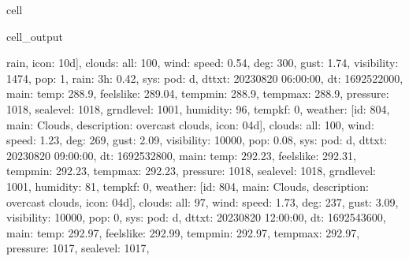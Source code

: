 \documentclass[letterpaper,10pt,english]{jupyterBook}
\begin{document}
\begin{sphinxuseclass}{cell}
\begin{sphinxVerbatimOutput}
\begin{sphinxuseclass}{cell_output}
\begin{sphinxVerbatim}[commandchars=\\\{\}]
rain\PYGZsq{}, \PYGZsq{}icon\PYGZsq{}: \PYGZsq{}10d\PYGZsq{}\PYGZcb{}], \PYGZsq{}clouds\PYGZsq{}: \PYGZob{}\PYGZsq{}all\PYGZsq{}: 100\PYGZcb{}, \PYGZsq{}wind\PYGZsq{}: \PYGZob{}\PYGZsq{}speed\PYGZsq{}: 0.54, \PYGZsq{}deg\PYGZsq{}: 300, \PYGZsq{}gust\PYGZsq{}: 1.74\PYGZcb{}, \PYGZsq{}visibility\PYGZsq{}: 1474, \PYGZsq{}pop\PYGZsq{}: 1, \PYGZsq{}rain\PYGZsq{}: \PYGZob{}\PYGZsq{}3h\PYGZsq{}: 0.42\PYGZcb{}, \PYGZsq{}sys\PYGZsq{}: \PYGZob{}\PYGZsq{}pod\PYGZsq{}: \PYGZsq{}d\PYGZsq{}\PYGZcb{}, \PYGZsq{}dt\PYGZus{}txt\PYGZsq{}: \PYGZsq{}2023\PYGZhy{}08\PYGZhy{}20 06:00:00\PYGZsq{}\PYGZcb{}, \PYGZob{}\PYGZsq{}dt\PYGZsq{}: 1692522000, \PYGZsq{}main\PYGZsq{}: \PYGZob{}\PYGZsq{}temp\PYGZsq{}: 288.9, \PYGZsq{}feels\PYGZus{}like\PYGZsq{}: 289.04, \PYGZsq{}temp\PYGZus{}min\PYGZsq{}: 288.9, \PYGZsq{}temp\PYGZus{}max\PYGZsq{}: 288.9, \PYGZsq{}pressure\PYGZsq{}: 1018, \PYGZsq{}sea\PYGZus{}level\PYGZsq{}: 1018, \PYGZsq{}grnd\PYGZus{}level\PYGZsq{}: 1001, \PYGZsq{}humidity\PYGZsq{}: 96, \PYGZsq{}temp\PYGZus{}kf\PYGZsq{}: 0\PYGZcb{}, \PYGZsq{}weather\PYGZsq{}: [\PYGZob{}\PYGZsq{}id\PYGZsq{}: 804, \PYGZsq{}main\PYGZsq{}: \PYGZsq{}Clouds\PYGZsq{}, \PYGZsq{}description\PYGZsq{}: \PYGZsq{}overcast clouds\PYGZsq{}, \PYGZsq{}icon\PYGZsq{}: \PYGZsq{}04d\PYGZsq{}\PYGZcb{}], \PYGZsq{}clouds\PYGZsq{}: \PYGZob{}\PYGZsq{}all\PYGZsq{}: 100\PYGZcb{}, \PYGZsq{}wind\PYGZsq{}: \PYGZob{}\PYGZsq{}speed\PYGZsq{}: 1.23, \PYGZsq{}deg\PYGZsq{}: 269, \PYGZsq{}gust\PYGZsq{}: 2.09\PYGZcb{}, \PYGZsq{}visibility\PYGZsq{}: 10000, \PYGZsq{}pop\PYGZsq{}: 0.08, \PYGZsq{}sys\PYGZsq{}: \PYGZob{}\PYGZsq{}pod\PYGZsq{}: \PYGZsq{}d\PYGZsq{}\PYGZcb{}, \PYGZsq{}dt\PYGZus{}txt\PYGZsq{}: \PYGZsq{}2023\PYGZhy{}08\PYGZhy{}20 09:00:00\PYGZsq{}\PYGZcb{}, \PYGZob{}\PYGZsq{}dt\PYGZsq{}: 1692532800, \PYGZsq{}main\PYGZsq{}: \PYGZob{}\PYGZsq{}temp\PYGZsq{}: 292.23, \PYGZsq{}feels\PYGZus{}like\PYGZsq{}: 292.31, \PYGZsq{}temp\PYGZus{}min\PYGZsq{}: 292.23, \PYGZsq{}temp\PYGZus{}max\PYGZsq{}: 292.23, \PYGZsq{}pressure\PYGZsq{}: 1018, \PYGZsq{}sea\PYGZus{}level\PYGZsq{}: 1018, \PYGZsq{}grnd\PYGZus{}level\PYGZsq{}: 1001, \PYGZsq{}humidity\PYGZsq{}: 81, \PYGZsq{}temp\PYGZus{}kf\PYGZsq{}: 0\PYGZcb{}, \PYGZsq{}weather\PYGZsq{}: [\PYGZob{}\PYGZsq{}id\PYGZsq{}: 804, \PYGZsq{}main\PYGZsq{}: \PYGZsq{}Clouds\PYGZsq{}, \PYGZsq{}description\PYGZsq{}: \PYGZsq{}overcast clouds\PYGZsq{}, \PYGZsq{}icon\PYGZsq{}: \PYGZsq{}04d\PYGZsq{}\PYGZcb{}], \PYGZsq{}clouds\PYGZsq{}: \PYGZob{}\PYGZsq{}all\PYGZsq{}: 97\PYGZcb{}, \PYGZsq{}wind\PYGZsq{}: \PYGZob{}\PYGZsq{}speed\PYGZsq{}: 1.73, \PYGZsq{}deg\PYGZsq{}: 237, \PYGZsq{}gust\PYGZsq{}: 3.09\PYGZcb{}, \PYGZsq{}visibility\PYGZsq{}: 10000, \PYGZsq{}pop\PYGZsq{}: 0, \PYGZsq{}sys\PYGZsq{}: \PYGZob{}\PYGZsq{}pod\PYGZsq{}: \PYGZsq{}d\PYGZsq{}\PYGZcb{}, \PYGZsq{}dt\PYGZus{}txt\PYGZsq{}: \PYGZsq{}2023\PYGZhy{}08\PYGZhy{}20 12:00:00\PYGZsq{}\PYGZcb{}, \PYGZob{}\PYGZsq{}dt\PYGZsq{}: 1692543600, \PYGZsq{}main\PYGZsq{}: \PYGZob{}\PYGZsq{}temp\PYGZsq{}: 292.97, \PYGZsq{}feels\PYGZus{}like\PYGZsq{}: 292.99, \PYGZsq{}temp\PYGZus{}min\PYGZsq{}: 292.97, \PYGZsq{}temp\PYGZus{}max\PYGZsq{}: 292.97, \PYGZsq{}pressure\PYGZsq{}: 1017, \PYGZsq{}sea\PYGZus{}level\PYGZsq{}: 1017, 
\end{sphinxVerbatim}
\end{sphinxuseclass}
\end{sphinxVerbatimOutput}
\end{sphinxuseclass}
\end{document}
